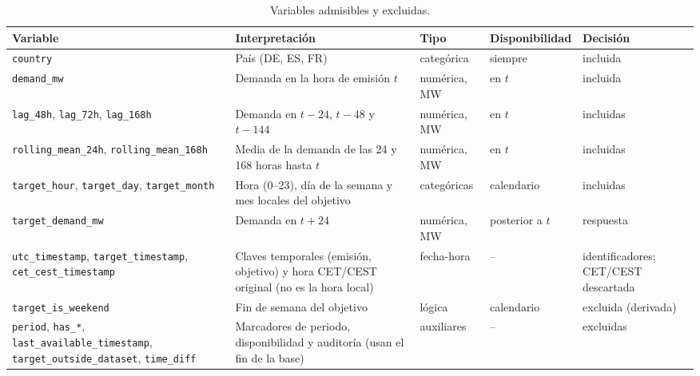 \begin{table}[!htbp]
    \centering
        \caption{Variables admisibles y excluidas.}
        \footnotesize
        \label{tab:variables}
        \renewcommand{\arraystretch}{1.1}
        \begin{tabular}{@{}p{4.6cm}p{5.4cm}p{1.9cm}p{1.9cm}p{1.9cm}@{}}
            \toprule
            Variable & Interpretación & Tipo & Disponibilidad & Decisión \\
            \midrule
            \texttt{country} & País (DE, ES, FR) & categórica & siempre & incluida \\
            \texttt{demand\_mw} & Demanda en la hora de emisión $t$ & numérica, MW & en $t$ & incluida \\
            \texttt{lag\_48h}, \texttt{lag\_72h}, \texttt{lag\_168h} & Demanda en $t-24$, $t-48$ y $t-144$ & numérica, MW & en $t$ & incluidas \\
            \texttt{rolling\_mean\_24h}, \texttt{rolling\_mean\_168h} & Media de la demanda de las 24 y 168 horas hasta $t$ & numérica, MW & en $t$ & incluidas \\
            \texttt{target\_hour}, \texttt{target\_day}, \texttt{target\_month} & Hora (0--23), día de la semana y mes locales del objetivo & categóricas & calendario & incluidas \\
            \midrule
            \texttt{target\_demand\_mw} & Demanda en $t+24$ & numérica, MW & posterior a $t$ & respuesta \\
            \texttt{utc\_timestamp}, \texttt{target\_timestamp}, \texttt{cet\_cest\_timestamp} & Claves temporales (emisión, objetivo) y hora CET/CEST original (no es la hora local) & fecha-hora & -- & identificadores; CET/CEST descartada \\
            \texttt{target\_is\_weekend} & Fin de semana del objetivo & lógica & calendario & excluida (derivada) \\
            \texttt{period}, \texttt{has\_*}, \texttt{last\_available\_timestamp}, \texttt{target\_outside\_dataset}, \texttt{time\_diff} & Marcadores de periodo, disponibilidad y auditoría (usan el fin de la base) & auxiliares & -- & excluidas \\
            \bottomrule
        \end{tabular}
\end{table}
